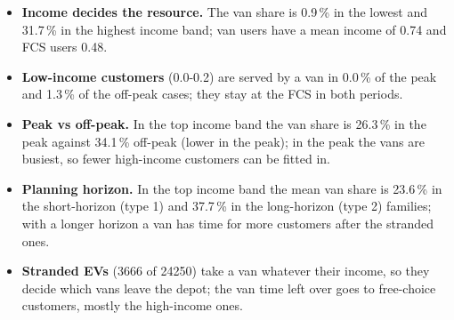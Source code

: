 \begin{itemize}
  \item \textbf{Income decides the resource.} The van share is 0.9\,\% in the lowest and 31.7\,\% in the highest income band; van users have a mean income of 0.74 and FCS users 0.48.
  \item \textbf{Low-income customers} (0.0-0.2) are served by a van in 0.0\,\% of the peak and 1.3\,\% of the off-peak cases; they stay at the FCS in both periods.
  \item \textbf{Peak vs off-peak.} In the top income band the van share is 26.3\,\% in the peak against 34.1\,\% off-peak (lower in the peak); in the peak the vans are busiest, so fewer high-income customers can be fitted in.
  \item \textbf{Planning horizon.} In the top income band the mean van share is 23.6\,\% in the short-horizon (type 1) and 37.7\,\% in the long-horizon (type 2) families; with a longer horizon a van has time for more customers after the stranded ones.
  \item \textbf{Stranded EVs} (3666 of 24250) take a van whatever their income, so they decide which vans leave the depot; the van time left over goes to free-choice customers, mostly the high-income ones.
\end{itemize}
